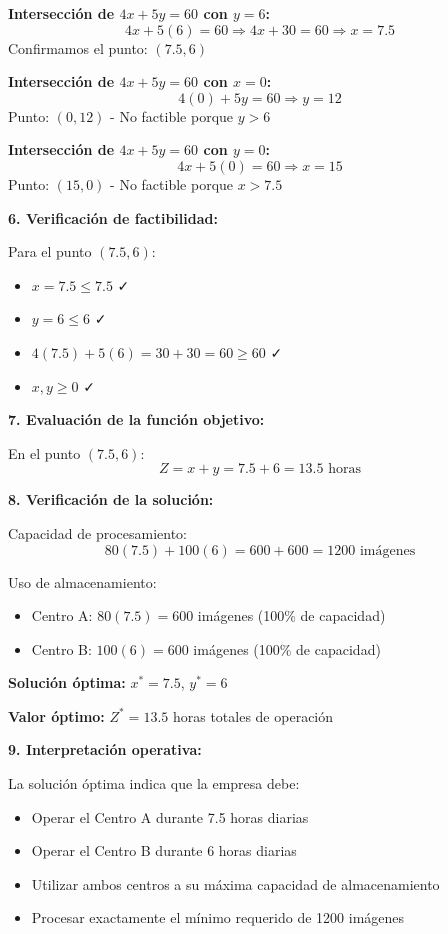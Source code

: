 \documentclass[12pt,a4paper]{article}
\begin{document}
\textbf{Intersección de $4x + 5y = 60$ con $y = 6$:}
\[
4x + 5(6) = 60 \Rightarrow 4x + 30 = 60 \Rightarrow x = 7.5
\]
Confirmamos el punto: $(7.5, 6)$

\textbf{Intersección de $4x + 5y = 60$ con $x = 0$:}
\[
4(0) + 5y = 60 \Rightarrow y = 12
\]
Punto: $(0, 12)$ - No factible porque $y > 6$

\textbf{Intersección de $4x + 5y = 60$ con $y = 0$:}
\[
4x + 5(0) = 60 \Rightarrow x = 15
\]
Punto: $(15, 0)$ - No factible porque $x > 7.5$

\textbf{6. Verificación de factibilidad:}

Para el punto $(7.5, 6)$:
\begin{itemize}
\item $x = 7.5 \leq 7.5$ ✓
\item $y = 6 \leq 6$ ✓
\item $4(7.5) + 5(6) = 30 + 30 = 60 \geq 60$ ✓
\item $x, y \geq 0$ ✓
\end{itemize}

\textbf{7. Evaluación de la función objetivo:}

En el punto $(7.5, 6)$:
\[
Z = x + y = 7.5 + 6 = 13.5 \text{ horas}
\]

\textbf{8. Verificación de la solución:}

Capacidad de procesamiento:
\[
80(7.5) + 100(6) = 600 + 600 = 1200 \text{ imágenes}
\]

Uso de almacenamiento:
\begin{itemize}
\item Centro A: $80(7.5) = 600$ imágenes (100\% de capacidad)
\item Centro B: $100(6) = 600$ imágenes (100\% de capacidad)
\end{itemize}

\textbf{Solución óptima:} $x^* = 7.5$, $y^* = 6$

\textbf{Valor óptimo:} $Z^* = 13.5$ horas totales de operación

\textbf{9. Interpretación operativa:}

La solución óptima indica que la empresa debe:
\begin{itemize}
\item Operar el Centro A durante 7.5 horas diarias
\item Operar el Centro B durante 6 horas diarias
\item Utilizar ambos centros a su máxima capacidad de almacenamiento
\item Procesar exactamente el mínimo requerido de 1200 imágenes
\end{itemize}
\end{document}
